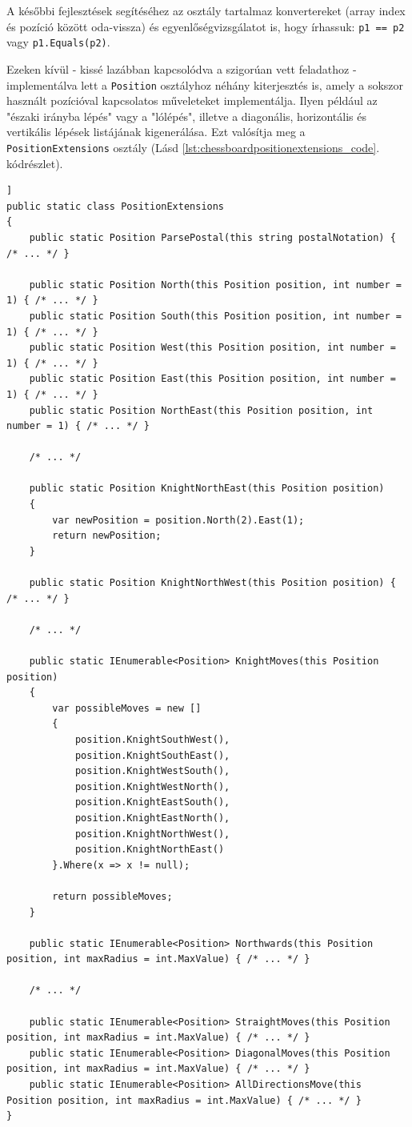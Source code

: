 \documentclass[twoside, a4paper, 12pt]{book}
\begin{document}
A későbbi fejlesztések segítéséhez az osztály tartalmaz konvertereket (array index és pozíció között oda-vissza) és egyenlőségvizsgálatot is, hogy írhassuk: \texttt{p1 == p2} vagy \texttt{p1.Equals(p2)}.

Ezeken kívül - kissé lazábban kapcsolódva a szigorúan vett feladathoz - implementálva lett a \texttt{Position} osztályhoz néhány kiterjesztés is, amely a sokszor használt pozícióval kapcsolatos műveleteket implementálja. Ilyen például az "északi irányba lépés" vagy a "lólépés", illetve a diagonális, horizontális és vertikális lépések listájának kigenerálása. Ezt valósítja meg a \texttt{PositionExtensions} osztály (Lásd \ref{lst:chessboardpositionextensions_code}. kódrészlet).

\begin{lstlisting}[caption=Pozíciók segédfüggvényes - PositionExtensions osztály, label=lst:chessboardpositionextensions_code, float,floatplacement=H]]
public static class PositionExtensions
{
	public static Position ParsePostal(this string postalNotation) { /* ... */ }

	public static Position North(this Position position, int number = 1) { /* ... */ }
	public static Position South(this Position position, int number = 1) { /* ... */ }
	public static Position West(this Position position, int number = 1) { /* ... */ }
	public static Position East(this Position position, int number = 1) { /* ... */ }
	public static Position NorthEast(this Position position, int number = 1) { /* ... */ }
	
	/* ... */

	public static Position KnightNorthEast(this Position position)
	{
		var newPosition = position.North(2).East(1);
		return newPosition;
	}

	public static Position KnightNorthWest(this Position position) { /* ... */ }

	/* ... */

	public static IEnumerable<Position> KnightMoves(this Position position)
	{
		var possibleMoves = new []
		{
			position.KnightSouthWest(),
			position.KnightSouthEast(),
			position.KnightWestSouth(),
			position.KnightWestNorth(),
			position.KnightEastSouth(),
			position.KnightEastNorth(),
			position.KnightNorthWest(),
			position.KnightNorthEast()
		}.Where(x => x != null);
		
		return possibleMoves;
	}

	public static IEnumerable<Position> Northwards(this Position position, int maxRadius = int.MaxValue) { /* ... */ }

	/* ... */

	public static IEnumerable<Position> StraightMoves(this Position position, int maxRadius = int.MaxValue) { /* ... */ }
	public static IEnumerable<Position> DiagonalMoves(this Position position, int maxRadius = int.MaxValue) { /* ... */ }
	public static IEnumerable<Position> AllDirectionsMove(this Position position, int maxRadius = int.MaxValue) { /* ... */ }
}
\end{lstlisting}
\end{document}
